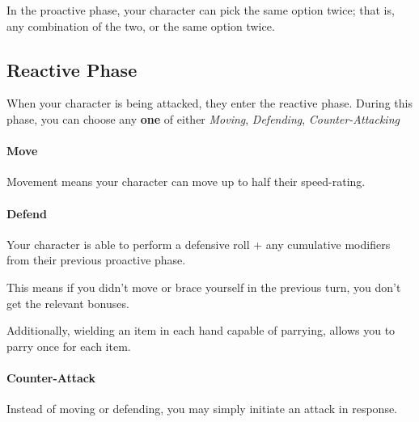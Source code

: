 \note In the proactive phase, your character can pick the same option twice; that is, any combination of the two, or the same option twice.

\subsection{Reactive Phase}
When your character is being attacked, they enter the reactive phase.
During this phase, you can choose any \textbf{one} of either \textit{Moving}, \textit{Defending}, \textit{Counter-Attacking}

\paragraph{Move}
Movement means your character can move up to half their speed-rating.

\paragraph{Defend}
Your character is able to perform a defensive roll + any cumulative modifiers from their previous proactive phase.

This means if you didn't move or brace yourself in the previous turn, you don't get the relevant bonuses.

Additionally, wielding an item in each hand capable of parrying, allows you to parry once for each item.

\paragraph{Counter-Attack}
Instead of moving or defending, you may simply initiate an attack in response.